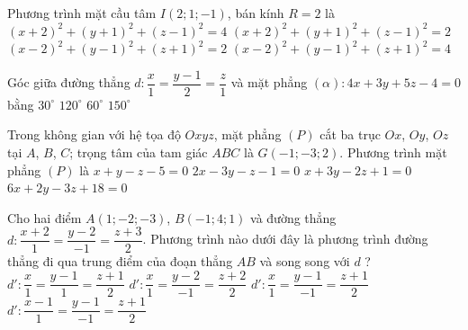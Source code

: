\begin{ex}%
	Phương trình mặt cầu tâm $I(2;1;-1)$, bán kính $R=2$ là
	\choice
	{$(x+2)^2+(y+1)^2+(z-1)^2=4$}
	{$(x+2)^2+(y+1)^2+(z-1)^2=2$}
	{$(x-2)^2+(y-1)^2+(z+1)^2=2$}
	{\True $(x-2)^2+(y-1)^2+(z+1)^2=4$}
\end{ex}
\begin{ex}%
	Góc giữa đường thẳng $d: \dfrac{x}{1}=\dfrac{y-1}{2}=\dfrac{z}{1}$ và mặt phẳng $(\alpha): 4x+3y+5z-4=0$ bằng
	\choice
	{$30^{\circ}$}
	{$120^{\circ}$}
	{\True $60^{\circ}$}
	{$150^{\circ}$}
\end{ex}
\begin{ex}%
	Trong không gian với hệ tọa độ $Oxyz$, mặt phẳng $(P)$ cắt ba trục $Ox$, $Oy$, $Oz$ tại $A$, $B$, $C$; trọng tâm của tam giác $ABC$ là $G(-1;-3;2)$. Phương trình mặt phẳng $(P)$ là
	\choice
	{$x+y-z-5=0$}
	{$2x-3y-z-1=0$}
	{$x+3y-2z+1=0$}
	{\True $6x+2y-3z+18=0$}
\end{ex}
\begin{ex}%
	Cho hai điểm $A(1;-2;-3)$, $B(-1;4;1)$ và đường thẳng $d \colon  \dfrac{x+2}{1}=\dfrac{y-2}{-1}=\dfrac{z+3}{2}$. Phương trình nào dưới đây là phương trình đường thẳng đi qua trung điểm của đoạn thẳng $AB$ và song song với $d$ ?
	\choice
	{$d' \colon  \dfrac{x}{1}=\dfrac{y-1}{1}=\dfrac{z+1}{2}$}
	{$d'\colon \dfrac{x}{1}=\dfrac{y-2}{-1}=\dfrac{z+2}{2}$}
	{\True $d'\colon \dfrac{x}{1}=\dfrac{y-1}{-1}=\dfrac{z+1}{2}$}
	{$d'\colon \dfrac{x-1}{1}=\dfrac{y-1}{-1}=\dfrac{z+1}{2}$}
\end{ex}


